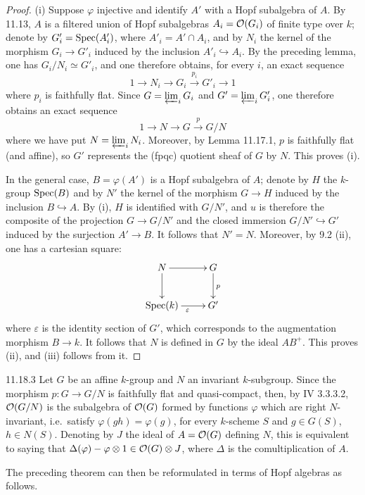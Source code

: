 \begin{proof}
(i) Suppose $\varphi$ injective and identify $A'$ with a Hopf subalgebra of $A$. By 11.13, $A$ is a filtered union of Hopf subalgebras $A_i=\mathcal{O}(G_i)$ of finite type over $k$; denote by $G'_i=\operatorname{Spec}(A'_i)$, where $A'_i=A'\cap A_i$, and by $N_i$ the kernel of the morphism $G_i\to G'_i$ induced by the inclusion $A'_i\hookrightarrow A_i$. By the preceding lemma, one has $G_i/N_i\simeq G'_i$, and one therefore obtains, for every $i$, an exact sequence
\[
1\to N_i\to G_i\xrightarrow{p_i}G'_i\to1
\]
where $p_i$ is faithfully flat. Since $G=\varprojlim_i G_i$ and $G'=\varprojlim_i G'_i$, one therefore obtains an exact sequence
\[
1\to N\to G\xrightarrow{p}G/N
\]
where we have put $N=\varprojlim_i N_i$. Moreover, by Lemma 11.17.1, $p$ is faithfully flat (and affine), so $G'$ represents the (fpqc) quotient sheaf of $G$ by $N$. This proves (i).

In the general case, $B=\varphi(A')$ is a Hopf subalgebra of $A$; denote by $H$ the $k$-group $\operatorname{Spec}(B)$ and by $N'$ the kernel of the morphism $G\to H$ induced by the inclusion $B\hookrightarrow A$. By (i), $H$ is identified with $G/N'$, and $u$ is therefore the composite of the projection $G\to G/N'$ and the closed immersion $G/N'\hookrightarrow G'$ induced by the surjection $A'\to B$. It follows that $N'=N$. Moreover, by 9.2 (ii), one has a cartesian square:
\[
\xymatrix{N\ar[r]\ar[d]&G\ar[d]^p\\\Spec(k)\ar[r]_\varepsilon&G'}
\]
where $\varepsilon$ is the identity section of $G'$, which corresponds to the augmentation morphism $B\to k$. It follows that $N$ is defined in $G$ by the ideal $AB^+$. This proves (ii), and (iii) follows from it.
\end{proof}

\begin{remark}{11.18.3}\label{VIB.11.18.3}
Let $G$ be an affine $k$-group and $N$ an invariant $k$-subgroup. Since the morphism $p:G\to G/N$ is faithfully flat and quasi-compact, then, by IV 3.3.3.2, $\mathcal{O}(G/N)$ is the subalgebra of $\mathcal{O}(G)$ formed by functions $\varphi$ which are right $N$-invariant, i.e.\ satisfy $\varphi(gh)=\varphi(g)$, for every $k$-scheme $S$ and $g\in G(S)$, $h\in N(S)$. Denoting by $J$ the ideal of $A=\mathcal{O}(G)$ defining $N$, this is equivalent to saying that $\Delta(\varphi)-\varphi\otimes1\in\mathcal{O}(G)\otimes J$, where $\Delta$ is the comultiplication of $A$.
\end{remark}
The preceding theorem can then be reformulated in terms of Hopf algebras as follows.

